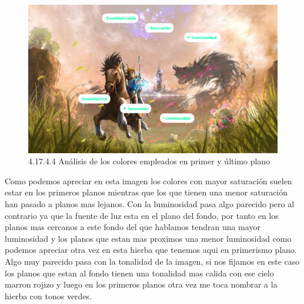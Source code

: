 \documentclass[12pt]{article}
\begin{document}
        \begin{figure}[H]
          \centering
          \includegraphics[width=\textwidth]{images/Saúl/Sección 17/EA_img17_4Color_4AnalisisPlanosPrimeroFondo.png}
          \caption{\small 4.17.4.4 Análisis de los colores empleados en primer y último plano}
        \end{figure}
        Como podemos apreciar en esta imagen los colores con mayor saturación suelen estar en los primeros planos mientras que los que tienen una menor saturación han pasado a planos mas lejanos. Con la luminosidad pasa algo parecido pero al contrario ya que la fuente de luz esta en el plano del fondo, por tanto en los planos mas cercanos a este fondo del que hablamos tendran una mayor luminosidad y los planos que estan mas proximos una menor luminosidad como podemos apreciar otra vez en esta hierba que tenemos aqui en primerismo plano. Algo muy parecido pasa con la tonalidad de la imagen, si nos fijamos en este caso los planos que estan al fondo tienen una tonalidad mas calida con ese cielo marron rojizo y luego en los primeros planos otra vez me toca nombrar a la hierba con tonos verdes.


        \newpage

\end{document}
